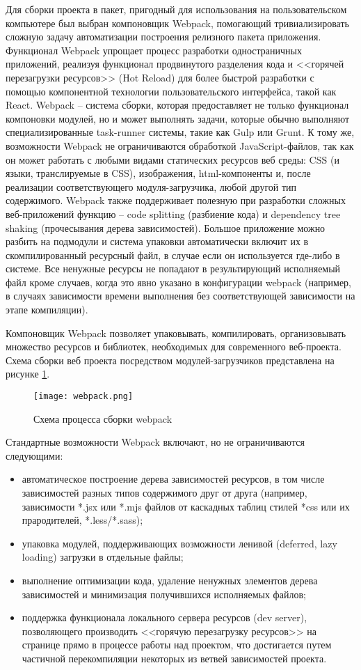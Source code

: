 Для сборки проекта в пакет, пригодный для использования на пользовательском компьютере был выбран компоновщик Webpack, помогающий тривиализировать сложную задачу
автоматизации построения релизного пакета приложения. Функционал Webpack упрощает процесс разработки одностраничных приложений, реализуя функционал продвинутого
разделения кода и <<горячей перезагрузки ресурсов>> (Hot Reload) для более быстрой разработки с помощью компонентной технологии пользовательского интерфейса, такой как React.
Webpack -- система сборки, которая предоставляет не только функционал компоновки модулей, но и может выполнять задачи, которые обычно выполняют специализированные task-runner системы,
такие как Gulp или Grunt. К тому же, возможности Webpack не ограничиваются обработкой JavaScript-файлов, так как он может работать с любыми видами статических ресурсов веб среды:
CSS (и языки, транслируемые в CSS), изображения, html-компоненты и, после реализации соответствующего модуля-загрузчика, любой другой тип содержимого. Webpack также поддерживает
полезную при разработки сложных веб-приложений функцию -- code splitting (разбиение кода) и dependency tree shaking (прочесывания дерева зависимостей). Большое приложение можно
разбить на подмодули и система упаковки автоматически включит их в скомпилированный ресурсный файл, в случае если он используется где-либо в системе. Все ненужные ресурсы не попадают
в результирующий исполняемый файл кроме случаев, когда это явно указано в конфигурации webpack (например, в случаях зависимости времени выполнения без соответствующей зависимости на
этапе компиляции).

Компоновщик Webpack позволяет упаковывать, компилировать, организовывать множество ресурсов и библиотек, необходимых для современного веб-проекта. Схема сборки веб проекта посредством
модулей-загрузчиков представлена на рисунке \ref{figure:domain:webpack}.

\begin{figure}[ht]
\centering
  \texttt{[image: webpack.png]}
  \caption{Схема процесса сборки webpack}
  \label{figure:domain:webpack}
\end{figure}

Стандартные возможности Webpack включают, но не ограничиваются следующими:
\begin{itemize}
\item автоматическое построение дерева зависимостей ресурсов, в том числе зависимостей разных типов содержимого друг от друга (например, зависимости *.jsx или *.mjs файлов от каскадных таблиц
стилей *css или их прародителей, *.less/*.sass);
\item упаковка модулей, поддерживающих возможности ленивой (deferred, lazy loading) загрузки в отдельные файлы;
\item выполнение оптимизации кода, удаление ненужных элементов дерева зависимостей и минимизация получившихся исполняемых файлов;
\item поддержка функционала локального сервера ресурсов (dev server), позволяющего производить <<горячую перезагрузку ресурсов>> на странице прямо в процессе работы над проектом, что достигается
путем частичной перекомпиляции некоторых из ветвей зависимостей проекта.
\end{itemize}

